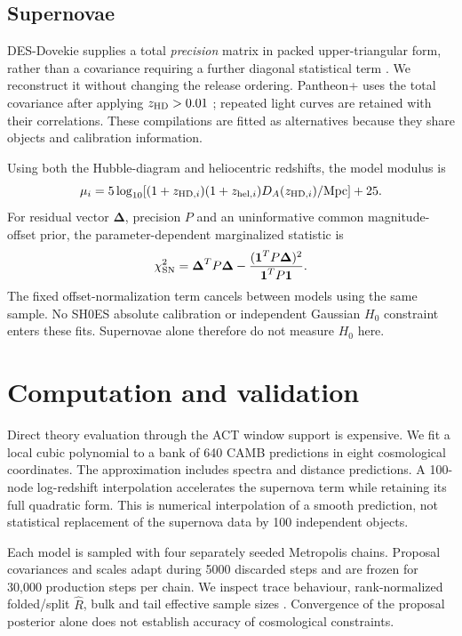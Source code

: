 \documentclass[fleqn,usenatbib]{mnras}
\begin{document}
\subsection{Supernovae}
DES-Dovekie supplies a total \emph{precision} matrix in packed upper-triangular
form, rather than a covariance requiring a further diagonal statistical term
\citep{Dovekie}. We reconstruct it without changing the release ordering.
Pantheon+ uses the total covariance after applying $z_{\rm HD}>0.01$
\citep{Pantheon,PantheonData}; repeated light curves are retained with their
correlations. These compilations are fitted as alternatives because they share
objects and calibration information.

Using both the Hubble-diagram and heliocentric redshifts, the model modulus is
\begin{equation}
 \mu_i=5\log_{10}\!\left[(1+z_{{\rm HD},i})(1+z_{{\rm hel},i})
 D_A(z_{{\rm HD},i})/{\rm Mpc}\right]+25.
\end{equation}
For residual vector $\boldsymbol\Delta$, precision $P$ and an uninformative
common magnitude-offset prior, the parameter-dependent marginalized statistic is
\begin{equation}
 \chi^2_{\rm SN}=\boldsymbol\Delta^TP\boldsymbol\Delta
 -\frac{(\boldsymbol 1^TP\boldsymbol\Delta)^2}{\boldsymbol 1^TP\boldsymbol 1}.
\end{equation}
The fixed offset-normalization term cancels between models using the same
sample. No SH0ES absolute calibration or independent Gaussian $H_0$ constraint
enters these fits. Supernovae alone therefore do not measure $H_0$ here.

\section{Computation and validation}\label{sec:computation}
Direct theory evaluation through the ACT window support is expensive. We fit a
local cubic polynomial to a bank of 640 CAMB predictions in eight
cosmological coordinates. The approximation includes spectra and distance
predictions. A 100-node log-redshift interpolation accelerates the supernova
term while retaining its full quadratic form. This is numerical interpolation
of a smooth prediction, not statistical replacement of the supernova data by
100 independent objects.

Each model is sampled with four separately seeded Metropolis chains. Proposal
covariances and scales adapt during 5000 discarded steps and are frozen
for 30,000 production steps per chain. We inspect trace behaviour,
rank-normalized folded/split $\widehat R$, bulk and tail effective sample sizes
\citep{Rhat}. Convergence of the proposal posterior alone does not establish
accuracy of cosmological constraints.
\end{document}
